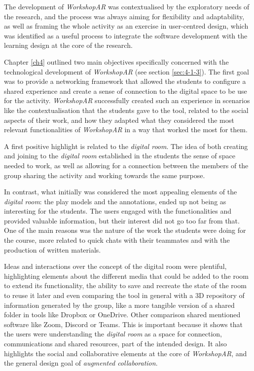 The development of \emph{WorkshopAR} was contextualised by the exploratory needs of the research, and the process was always aiming for flexibility and adaptability, as well as framing
the whole activity as an exercise in user-centred design, which was identified as a useful process to integrate the software development with the learning design at the core of the research.

Chapter \ref{ch4} outlined two main objectives specifically concerned with the technological development of \emph{WorkshopAR} (see section \ref{sec:4-1-3}). The first goal was to provide a
networking framework that allowed the students to configure a shared experience and create a sense of connection to the digital space to be use for the activity. \emph{WorkshopAR}
successfully created such an experience in scenarios like the contextualisation that the students gave to the tool, related to the social aspects of their work, and how they adapted what
they considered the most relevant functionalities of \emph{WorkshopAR} in a way that worked the most for them.

A first positive highlight is related to the \emph{digital room}. The idea of both creating and joining to the \emph{digital room} established in the students the sense of space needed to
work, as well as allowing for a connection between the members of the group sharing the activity and working towards the same purpose.

In contrast, what initially was considered the most appealing elements of the \emph{digital room}: the play models and the annotations, ended up not being as interesting for the students.
The users engaged with the functionalities and provided valuable information, but their interest did not go too far from that. One of the main reasons was the nature of the work the
students were doing for the course, more related to quick chats with their teammates and with the production of written materials.

Ideas and interactions over the concept of the digital room were plentiful, highlighting elements about the different media that could be added to the room to extend its functionality, the
ability to save and recreate the state of the room to reuse it later and even comparing the tool in general with a 3D repository of information generated by the group, like a more tangible
version of a shared folder in tools like Dropbox or OneDrive. Other comparison shared mentioned software like Zoom, Discord or Teams. This is important because it shows that the users were
understanding the \emph{digital room} as a space for connection, communications and shared resources, part of the intended design. It also highlights the social and collaborative elements
at the core of \emph{WorkshopAR}, and the general design goal of \emph{augmented collaboration}.

